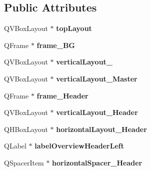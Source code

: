 \subsection*{Public Attributes}
\begin{DoxyCompactItemize}
\item 
\mbox{\label{class_ui___overview_page_a68037ee00c6e5ec10d7213c17d6d2062}} 
Q\+V\+Box\+Layout $\ast$ {\bfseries top\+Layout}
\item 
\mbox{\label{class_ui___overview_page_a64d807bb4e1bdf30874129c2c18e3b5d}} 
Q\+Frame $\ast$ {\bfseries frame\+\_\+\+BG}
\item 
\mbox{\label{class_ui___overview_page_a15adff9fcab1ec5c55df599ab4cfd786}} 
Q\+V\+Box\+Layout $\ast$ {\bfseries vertical\+Layout\+\_}
\item 
\mbox{\label{class_ui___overview_page_a813dd6485e2aa3a20359aff0f494d0c7}} 
Q\+V\+Box\+Layout $\ast$ {\bfseries vertical\+Layout\+\_\+\+Master}
\item 
\mbox{\label{class_ui___overview_page_aeeba9237f1366d83beca9a3bb09936ff}} 
Q\+Frame $\ast$ {\bfseries frame\+\_\+\+Header}
\item 
\mbox{\label{class_ui___overview_page_a1c8824a6d8aef8869ab5fa1ff636ef37}} 
Q\+V\+Box\+Layout $\ast$ {\bfseries vertical\+Layout\+\_\+\+Header}
\item 
\mbox{\label{class_ui___overview_page_a38b9e9f6d16cb43931866f52baa98575}} 
Q\+H\+Box\+Layout $\ast$ {\bfseries horizontal\+Layout\+\_\+\+Header}
\item 
\mbox{\label{class_ui___overview_page_a6af68e1c045dfc21bc62ba8ba28c89d7}} 
Q\+Label $\ast$ {\bfseries label\+Overview\+Header\+Left}
\item 
\mbox{\label{class_ui___overview_page_a38500bb0ee3ca3782b885b4ed561a615}} 
Q\+Spacer\+Item $\ast$ {\bfseries horizontal\+Spacer\+\_\+\+Header}
\item 
\mbox{\label{class_ui___overview_page_a1526f47edd5cab087a3ddbfc162039eb}} 

\end{DoxyCompactItemize}
